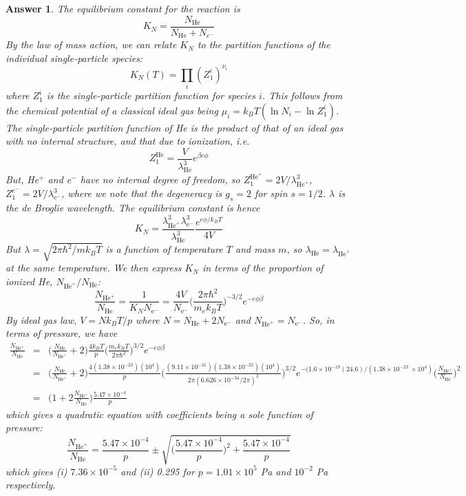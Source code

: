 \documentclass[a4paper]{article}
\newtheorem{ans}{Answer}[section]
\theoremstyle{new}
\begin{document}
\begin{ans}
The equilibrium constant for the reaction is
$$K_N=\frac{N_{\text{He}}}{N_{\text{He}}+N_{e^-}}$$
By the law of mass action, we can relate $K_N$ to the partition functions of the individual single-particle species:
$$K_N(T)=\prod_i(Z_1^i)^{\nu_i}$$
where $Z_1^i$ is the single-particle partition function for species $i$. This follows from the chemical potential of a classical ideal gas being $\mu_i=k_BT(\ln N_i-\ln Z_1^i)$. The single-particle partition function of He is the product of that of an ideal gas with no internal structure, and that due to ionization, i.e.
$$Z_1^{\text{He}}=\frac{V}{\lambda_{\text{He}}^3}e^{\beta e\phi}$$
But, He$^+$ and e$^-$ have no internal degree of freedom, so $Z_1^{\text{He}^+}=2V/\lambda_{\text{He}^+}^3$, $Z_1^{e^-}=2V/\lambda_{\text{e}^-}^3$, where we note that the degeneracy is $g_s=2$ for spin $s=1/2$. $\lambda$ is the de Broglie wavelength. The equilibrium constant is hence
$$K_N=\frac{\lambda_{\text{He}^+}^3\lambda_{\text{e}^-}^3}{\lambda^3_{\text{He}}}\frac{e^{e\phi/k_BT}}{4V}$$
But $\lambda=\sqrt{2\pi\hbar^2/mk_BT}$ is a function of temperature $T$ and mass $m$, so $\lambda_{\text{He}}=\lambda_{\text{He}^+}$ at the same temperature. We then express $K_N$ in terms of the proportion of ionized He, $N_{\text{He}^+}/N_{\text{He}}$:
$$\frac{N_{\text{He}^+}}{N_{\text{He}}}=\frac{1}{K_NN_{\text{e}^-}}=\frac{4V}{N_{\text{e}^-}}\bigg(\frac{2\pi\hbar^2}{m_ek_BT}\bigg)^{-3/2}e^{-e\phi\beta}$$
By ideal gas law, $V=Nk_BT/p$ where $N=N_{\text{He}}+2N_{\text{e}^-}$ and $N_{\text{He}^+}=N_{\text{e}^-}$. So, in terms of pressure, we have
\begin{eqnarray}
\frac{N_{\text{He}^+}}{N_{\text{He}}}&=&\bigg(\frac{N_{\text{He}}}{N_{\text{He}^+}}+2\bigg)\frac{4k_BT}{p}\bigg(\frac{m_ek_BT}{2\pi\hbar^2}\bigg)^{3/2}e^{-e\phi\beta}\nonumber\\&=&\bigg(\frac{N_{\text{He}}}{N_{\text{He}^+}}+2\bigg)\frac{4(1.38\times10^{-23})(10^4)}{p}\bigg(\frac{(9.11\times10^{-31})(1.38\times10^{-23})(10^4)}{2\pi(6.626\times10^{-34}/2\pi)^2}\bigg)^{3/2}e^{-(1.6\times10^{-19}(24.6)/(1.38\times10^{-23}~\times 10^4)}\nonumber\bigg(\frac{N_{\text{He}^+}}{N_{\text{He}}}\bigg)^2\nonumber\\&=&\bigg(1+2\frac{N_{\text{He}^+}}{N_{\text{He}}}\bigg)\frac{5.47\times10^{-4}}{p}\nonumber
\end{eqnarray}
which gives a quadratic equation with coefficients being a sole function of pressure:
$$\frac{N_{\text{He}^+}}{N_{\text{He}}}=\frac{5.47\times10^{-4}}{p}\pm\sqrt{\bigg(\frac{5.47\times10^{-4}}{p}\bigg)^2+\frac{5.47\times10^{-4}}{p}}$$
which gives (i) $7.36\times10^{-5}$ and (ii) 0.295 for $p=1.01\times10^5$ Pa and $10^{-2}$ Pa respectively.
\end{ans}
\end{document}
